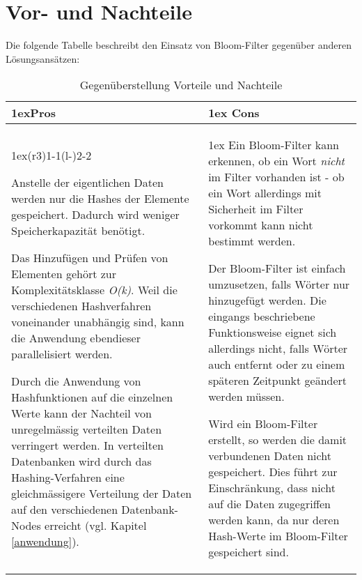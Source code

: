 \documentclass[10pt, a4paper, twocolumn]{article} %
\begin{document}
\section{Vor- und Nachteile}

Die folgende Tabelle beschreibt den Einsatz von Bloom-Filter gegenüber anderen Lösungsansätzen:

\begin{table}[h]
	\begin{tabularx}{\linewidth}{>{\parskip1ex}X@{\kern4\tabcolsep}>{\parskip1ex}X}
		\toprule
		\hfil\bfseries Pros
		&
		\hfil\bfseries Cons
		\\\cmidrule(r{3\tabcolsep}){1-1}\cmidrule(l{-\tabcolsep}){2-2}

		\lipsum[1] Anstelle der eigentlichen Daten werden nur die Hashes der Elemente gespeichert. Dadurch wird weniger Speicherkapazität benötigt.
		\par
		\lipsum[2] Das Hinzufügen und Prüfen von Elementen gehört zur Komplexitätsklasse \textit{O(k)}. Weil die verschiedenen Hashverfahren voneinander unabhängig sind, kann die Anwendung ebendieser parallelisiert werden.
		\par
		\lipsum[3] Durch die Anwendung von Hashfunktionen auf die einzelnen Werte kann der Nachteil von unregelmässig verteilten Daten verringert werden. In verteilten Datenbanken wird durch das Hashing-Verfahren eine gleichmässigere Verteilung der Daten auf den verschiedenen Datenbank-Nodes erreicht (vgl. Kapitel \ref{anwendung}).

		&
		\lipsum[1] Ein Bloom-Filter kann erkennen, ob ein Wort \textit{nicht} im Filter vorhanden ist - ob ein Wort allerdings mit Sicherheit im Filter vorkommt kann nicht bestimmt werden.
		\par
		\lipsum[2] Der Bloom-Filter ist einfach umzusetzen, falls Wörter nur hinzugefügt werden. Die eingangs beschriebene Funktionsweise eignet sich allerdings nicht, falls Wörter auch entfernt oder zu einem späteren Zeitpunkt geändert werden müssen.
		\par
		\lipsum[3] Wird ein Bloom-Filter erstellt, so werden die damit verbundenen Daten nicht gespeichert. Dies führt zur Einschränkung, dass nicht auf die Daten zugegriffen werden kann, da nur deren Hash-Werte im Bloom-Filter gespeichert sind.

		\\\bottomrule
	\end{tabularx}
	\caption{Gegenüberstellung Vorteile und Nachteile}
\end{table}
\end{document}
